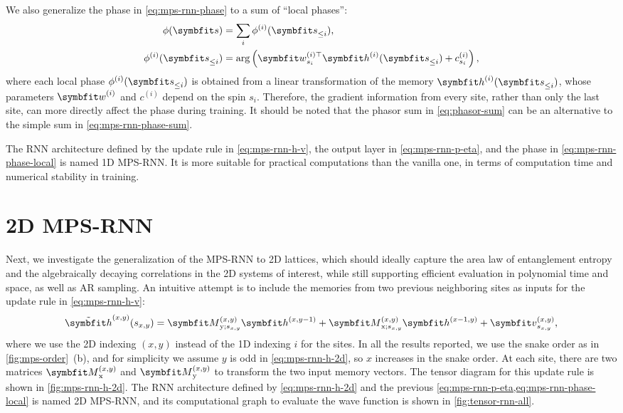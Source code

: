 We also generalize the phase in \cref{eq:mps-rnn-phase} to a sum of ``local phases'':
\begin{align}
\phi(\vs) &= \sum_i \phi^{(i)}(\vs_{\le i}), \label{eq:mps-rnn-phase-sum} \\
\phi^{(i)}(\vs_{\le i}) &= \arg\left( \vw^{(i) \transpose}_{s_i} \vh^{(i)}(\vs_{\le i}) + c^{(i)}_{s_i} \right), \label{eq:mps-rnn-phase-local}
\end{align}
where each local phase $\phi^{(i)}(\vs_{\le i})$ is obtained from a linear transformation of the memory $\vh^{(i)}(\vs_{\le i})$, whose parameters $\vw^{(i)}$ and $c^{(i)}$ depend on the spin $s_i$. Therefore, the gradient information from every site, rather than only the last site, can more directly affect the phase during training. It should be noted that the phasor sum in \cref{eq:phasor-sum} can be an alternative to the simple sum in \cref{eq:mps-rnn-phase-sum}.

The RNN architecture defined by the update rule in \cref{eq:mps-rnn-h-v}, the output layer in \cref{eq:mps-rnn-p-eta}, and the phase in \cref{eq:mps-rnn-phase-local} is named 1D MPS-RNN. It is more suitable for practical computations than the vanilla one, in terms of computation time and numerical stability in training.

\section{2D MPS-RNN}
\label{sec:2d-mps-rnn}

Next, we investigate the generalization of the MPS-RNN to 2D lattices, which should ideally capture the area law of entanglement entropy and the algebraically decaying correlations in the 2D systems of interest, while still supporting efficient evaluation in polynomial time and space, as well as AR sampling. An intuitive attempt is to include the memories from two previous neighboring sites as inputs for the update rule in \cref{eq:mps-rnn-h-v}:
\begin{equation}
\tilde{\vh}^{(x, y)}(s_{x, y}) =
\mM^{(x, y)}_{\text{y}; s_{x, y}} \vh^{(x, y - 1)}
+ \mM^{(x, y)}_{\text{x}; s_{x, y}} \vh^{(x - 1, y)}
+ \vv^{(x, y)}_{s_{x, y}},
\label{eq:mps-rnn-h-2d}
\end{equation}
where we use the 2D indexing $(x, y)$ instead of the 1D indexing $i$ for the sites. In all the results reported, we use the snake order as in \cref{fig:mps-order}~(b), and for simplicity we assume $y$ is odd in \cref{eq:mps-rnn-h-2d}, so $x$ increases in the snake order. At each site, there are two matrices $\mM^{(x, y)}_\text{x}$ and $\mM^{(x, y)}_\text{y}$ to transform the two input memory vectors. The tensor diagram for this update rule is shown in \cref{fig:mps-rnn-h-2d}. The RNN architecture defined by \cref{eq:mps-rnn-h-2d} and the previous \cref{eq:mps-rnn-p-eta,eq:mps-rnn-phase-local} is named 2D MPS-RNN, and its computational graph to evaluate the wave function is shown in \cref{fig:tensor-rnn-all}.

